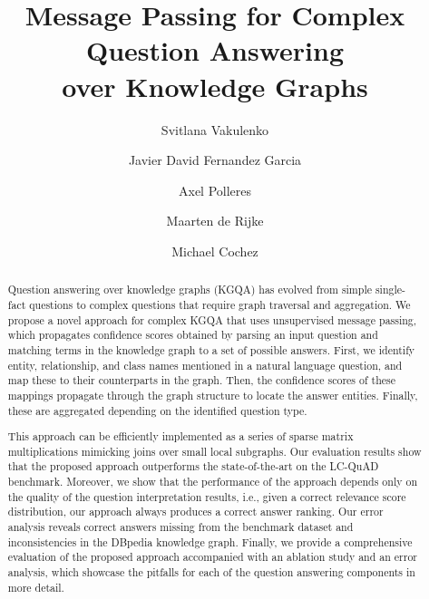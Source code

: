 \documentclass[sigconf,table,screen,review=false,anonymous=false]{acmart}
\begin{document}
\title[Message Passing for Complex Question Answering]{Message Passing for Complex Question Answering\\ over Knowledge Graphs}

\author{Svitlana Vakulenko}

\author{Javier David Fernandez Garcia}

\author{Axel Polleres}

\author{Maarten de Rijke}

\author{Michael Cochez}

\renewcommand{\shortauthors}{Vakulenko et al.}

\begin{abstract}
Question answering over knowledge graphs (KGQA) has evolved from simple single-fact questions to complex questions that require graph traversal and aggregation.
We propose a novel approach for complex KGQA that uses unsupervised message passing, which propagates confidence scores obtained by parsing an input question and matching terms in the knowledge graph to a set of possible answers.
First, we identify entity, relationship, and class names mentioned in a natural language question, and map these to their counterparts in the graph.
Then, the confidence scores of these mappings propagate through the graph structure to locate the answer entities.
Finally, these are aggregated depending on the identified question type.

This approach can be efficiently implemented as a series of sparse matrix multiplications mimicking joins over small local subgraphs.
Our evaluation results show that the proposed approach outperforms the state-of-the-art on the LC-QuAD benchmark.
Moreover, we show that the performance of the approach depends only on the quality of the question interpretation results, i.e., given a correct relevance score distribution, our approach always produces a correct answer ranking. 
Our error analysis reveals correct answers missing from the benchmark dataset and inconsistencies in the DBpedia knowledge graph.
Finally, we provide a comprehensive evaluation of the proposed approach accompanied with an ablation study and an error analysis, which showcase the pitfalls for each of the question answering components in more detail.
\end{abstract}
\end{document}
